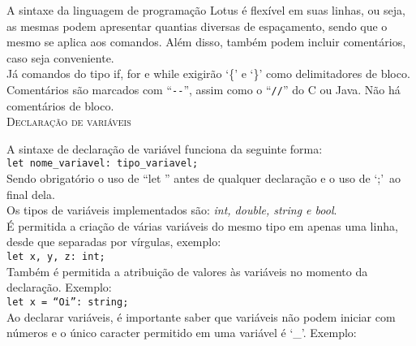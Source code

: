 \documentclass[12pt,a4paper]{article}
\begin{document}
A sintaxe da linguagem de programação Lotus é flexível em suas linhas, ou seja, as mesmas podem apresentar quantias diversas de espaçamento, sendo que o mesmo se aplica aos comandos. Além disso, também podem incluir comentários, caso seja conveniente. \\




Já comandos do tipo if, for e while exigirão `\{' e `\}' como delimitadores de bloco.
Comentários são marcados com ``\texttt{-{}-}'', assim como o ``\texttt{//}'' do C ou Java. Não há comentários de bloco.\\[0.3cm]

\hypertarget{label}{\Large{\textsc{Declaração de variáveis}}}\\
\normalsize

A sintaxe de declaração de variável funciona da seguinte forma:\\

\texttt{let nome\_variavel: tipo\_variavel;}\\

Sendo obrigatório o uso de ``let '' antes de qualquer declaração e o uso de `;'\ ao final dela.\\

Os tipos de variáveis implementados são: \textit{int, double, string e bool}.\\

É permitida a criação de várias variáveis do mesmo tipo em apenas uma linha, desde que separadas por vírgulas, exemplo:\\

\texttt{let x, y, z: int;}\\

Também é permitida a atribuição de valores às variáveis no momento da declaração. Exemplo:\\

\texttt{\noindent let x = ``Oi'': string;}\\

Ao declarar variáveis, é importante saber que variáveis não podem iniciar com números e o único caracter permitido em uma variável é `\_'. Exemplo: \\
\end{document}
